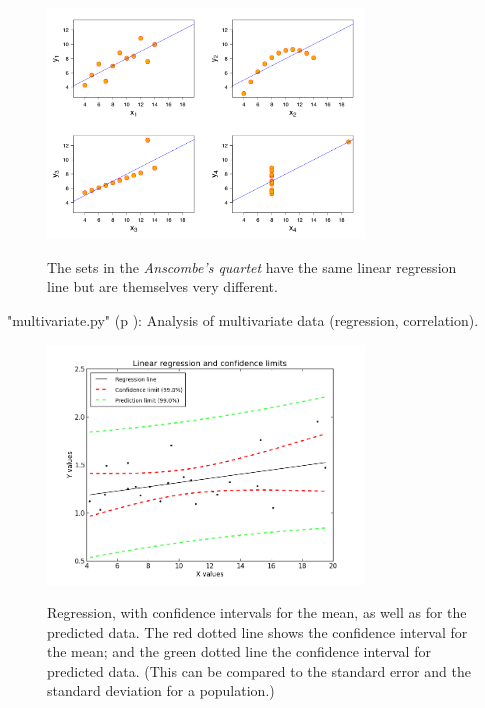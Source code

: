 \begin{figure}
  \centering
  \includegraphics[width=0.75\textwidth]{../Images/Anscombes_quartet.png}\\
  \caption{The sets in the \emph{Anscombe's quartet} have the same linear regression line but are themselves very different.}
\end{figure}

\PyImg "multivariate.py" (p \pageref{py:multivariate}): Analysis of multivariate data (regression, correlation).

\begin{figure}
  \centering
  \includegraphics[width=0.75\textwidth]{../Images/regression_wLegend.png}\\
  \caption{Regression, with confidence intervals for the mean, as well as for the predicted data. The red dotted line shows the confidence interval for the mean; and the green dotted line the confidence interval for predicted data. (This can be compared to the standard error and the standard deviation for a population.)} \label{fig:regline}
\end{figure}

